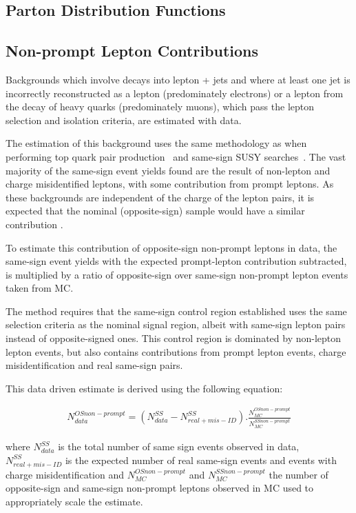 \subsection{Parton Distribution Functions}
\subsection{Non-prompt Lepton Contributions}
Backgrounds which involve decays into lepton + jets and where at least one jet is incorrectly reconstructed as a lepton (predominately electrons) or a lepton from the decay of heavy quarks (predominately muons), which pass the lepton selection and isolation criteria, are estimated with data.

The estimation of this background uses the same methodology as when performing top quark pair production~\cite{CMS:2016syx} and same-sign SUSY searches~\cite{CMS:2015vqc}.
The vast majority of the same-sign event yields found are the result of non-lepton and charge misidentified leptons, with some contribution from prompt leptons.
As these backgrounds are independent of the charge of the lepton pairs, it is expected that the nominal (opposite-sign) sample would have a similar contribution \cite{CMS:2015vqc}.

To estimate this contribution of opposite-sign non-prompt leptons in data, the same-sign event yields with the expected prompt-lepton contribution subtracted, is multiplied by a ratio of opposite-sign over same-sign non-prompt lepton events taken from MC.

The method requires that the same-sign control region established uses the same selection criteria as the nominal signal region, albeit with same-sign lepton pairs instead of opposite-signed ones.
This control region is dominated by non-lepton lepton events, but also contains contributions from prompt lepton events, charge misidentification and real same-sign pairs.

This data driven estimate is derived using the following equation:

\begin{equation}
\begin{align}
 N_{data}^{OS non-prompt} = (N_{data}^{SS} - N^{SS}_{real + mis-ID}).\frac{N_{MC}^{OS non-prompt}}{N_{MC}^{SS non-prompt}}
\end{align}
\end{equation}

where $N_{data}^{SS}$ is the total number of same sign events observed in data, $N^{SS}_{real + mis-ID}$ is the expected number of real same-sign events and events with charge misidentification and $N_{MC}^{OS non-prompt}$ and $N_{MC}^{SS non-prompt}$ the number of opposite-sign and same-sign non-prompt leptons observed in MC used to appropriately scale the estimate.

